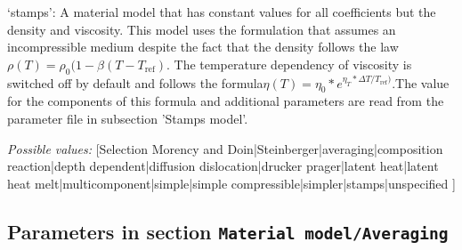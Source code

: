 \begin{itemize}
`stamps': A material model that has constant values for all coefficients but the density and viscosity. This model uses the formulation that assumes an incompressible medium despite the fact that the density follows the law $\rho(T)=\rho_0(1-\beta(T-T_{\text{ref}})$. The temperature dependency of viscosity is  switched off by default and follows the formula$\eta(T)=\eta_0*e^{\eta_T*\Delta T / T_{\text{ref}})}$.The value for the components of this formula and additional parameters are read from the parameter file in subsection 'Stamps model'.


{\it Possible values:} [Selection Morency and Doin|Steinberger|averaging|composition reaction|depth dependent|diffusion dislocation|drucker prager|latent heat|latent heat melt|multicomponent|simple|simple compressible|simpler|stamps|unspecified ]
\end{itemize}



\subsection{Parameters in section \tt Material model/Averaging}
\label{parameters:Material_20model/Averaging}

